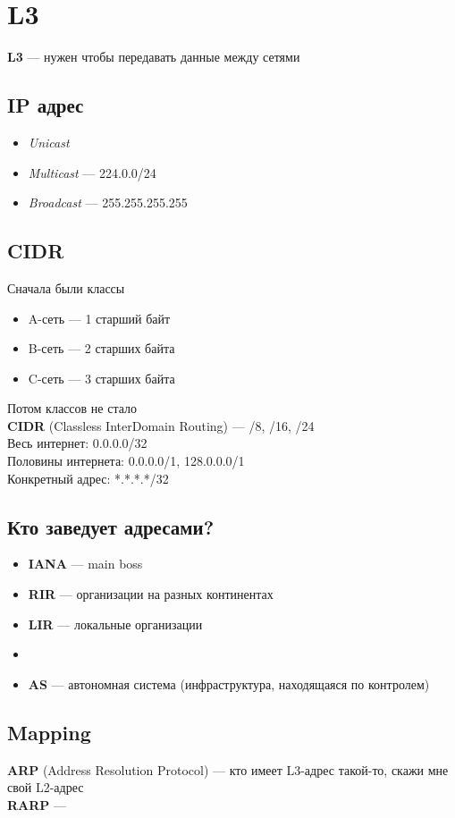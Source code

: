 \section{L3}
\textbf{L3} --- нужен чтобы передавать данные между сетями

\subsection{IP адрес}
\begin{itemize}
    \item \emph{Unicast}
    \item \emph{Multicast} --- 224.0.0/24
    \item \emph{Broadcast} --- 255.255.255.255
\end{itemize}

\subsection{CIDR}
Сначала были классы
\begin{itemize}
    \item A-сеть --- 1 старший байт
    \item B-сеть --- 2 старших байта
    \item C-сеть --- 3 старших байта
\end{itemize}
Потом классов не стало\\
\textbf{CIDR} (Classless InterDomain Routing) --- /8, /16, /24\\
Весь интернет: 0.0.0.0/32\\
Половины интернета: 0.0.0.0/1, 128.0.0.0/1\\
Конкретный адрес: *.*.*.*/32

\subsection{Кто заведует адресами?}
\begin{itemize}
    \item \textbf{IANA} --- main boss
    \item \textbf{RIR} --- организации на разных континентах
    \item \textbf{LIR} --- локальные организации
    \item {}
    \item \textbf{AS} --- автономная система (инфраструктура, находящаяся по контролем)
\end{itemize}

\subsection{Mapping}
\textbf{ARP} (Address Resolution Protocol) --- кто имеет L3-адрес такой-то, скажи мне свой L2-адрес\\
\textbf{RARP} --- 

